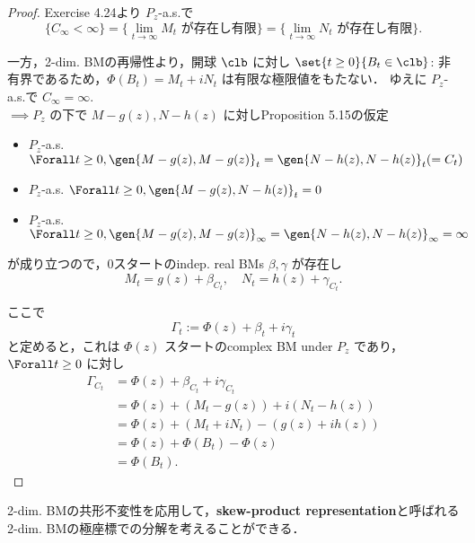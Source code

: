\documentclass{jsarticle}
\begin{document}
\begin{proof}
    Exercise 4.24より $P_z$-a.s.で
    $$
    \{C_\infty<\infty\}
    = \{\lim_{t\to\infty}M_t\text{ が存在し有限}\}
    = \{\lim_{t\to\infty}N_t\text{ が存在し有限}\}.
    $$
    
    一方，2-dim. BMの再帰性より，開球 $\clb$ に対し $\set{t\ge0}{B_t\in\clb}$: 非有界であるため，$\Phi(B_t)=M_t+iN_t$ は有限な極限値をもたない．
    ゆえに $P_z$-a.s.で $C_\infty=\infty.$ \\
    $\implies P_z$ の下で $M-g(z), N-h(z)$ に対しProposition 5.15の仮定
    \begin{itemize}
        \item 
        $P_z$-a.s. $\Forall t\ge0, \gen{M-g(z), M-g(z)}_t=\gen{N-h(z), N-h(z)}_t(=C_t)$
        \item 
        $P_z$-a.s. $\Forall t\ge0, \gen{M-g(z), N-h(z)}_t=0$
        \item 
        $P_z$-a.s. $\Forall t\ge0, \gen{M-g(z), M-g(z)}_{\infty}=\gen{N-h(z), N-h(z)}_{\infty}=\infty$
    \end{itemize}
    が成り立つので，0スタートのindep. real BMs $\beta, \gamma$ が存在し
    $$
    M_t=g(z)+\beta_{C_t},\quad
    N_t=h(z)+\gamma_{C_t}.
    $$

    ここで
    $$
    \Gamma_t
    := \Phi(z)+\beta_t+i\gamma_t
    $$
    と定めると，これは $\Phi(z)$ スタートのcomplex BM under $P_z$ であり，$\Forall t\ge0$ に対し
    \begin{align}
        \Gamma_{C_t}
        &= \Phi(z)+\beta_{C_t}+i\gamma_{C_t} \\
        &= \Phi(z)+(M_t-g(z))+i(N_t-h(z)) \\
        &= \Phi(z)+(M_t+iN_t)-(g(z)+ih(z)) \\
        &= \Phi(z)+\Phi(B_t)-\Phi(z) \\
        &= \Phi(B_t).
    \end{align}
\end{proof}

2-dim. BMの共形不変性を応用して，\textbf{skew-product representation}と呼ばれる2-dim. BMの極座標での分解を考えることができる．
\end{document}
